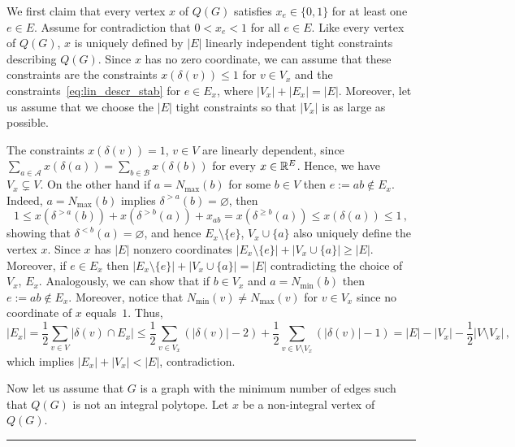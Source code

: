 \documentclass[3p,times]{elsarticle}
\newenvironment{proof}{{\bf Proof:  }}{\hfill\rule{2mm}{2mm}}
\begin{document}
\begin{proof}
  We first claim that every vertex $x$ of $Q(G)$ satisfies $x_e
  \in \{0,1\}$ for at least one $e \in E$. Assume for contradiction
  that $0 < x_e < 1$ for all $e \in E$. 
  Like every vertex of $Q(G)$, $x$ is uniquely defined by $|E|$ linearly independent tight constraints describing $Q(G)$. 
  Since $x$ has no zero coordinate, we can assume
  that these constraints are the constraints $x(\delta(v))\le 1$ for $v\in V_x$ 
  and the constraints~\eqref{eq:lin_descr_stab} for $e\in E_x$, where
  $|V_x|+|E_x|=|E|$. Moreover, let us assume that we choose the $|E|$
  tight constraints so that $|V_x|$ is as large as possible.

The constraints $x(\delta(v))=1$, $v\in V$ are linearly dependent, since $\sum_{a\in\mathcal{A}}x(\delta(a))=\sum_{b\in\mathcal{B}}x(\delta(b))$ for every $x \in \mathbb{R}^E$. Hence, we have $V_x\subsetneq V$. On the other hand if $a=N_{\max}(b)$ for some $b \in V$ then $e:=ab\not\in E_x$. Indeed, $a=N_{\max}(b)$ implies $\delta^{>a}(b)=\varnothing$, then
$$
	1\le x(\delta^{>a}(b))+ x(\delta^{>b}(a)) + x_{ab}=x(\delta^{\ge b}(a)) \le x(\delta(a)) \le 1\,,
$$
showing that $\delta^{< b}(a)=\varnothing$, and hence $E_x\setminus \{e\}$, $V_x\cup \{a\}$ also uniquely define the vertex $x$. Since $x$ has $|E|$ nonzero coordinates $|E_x \setminus \{e\}| + |V_x \cup \{a\}| \geq |E|$. Moreover, if $e \in E_x$ then $|E_x \setminus \{e\}| + |V_x \cup \{a\}| = |E|$ contradicting the choice of $V_x$, $E_x$. Analogously, we can show that if $b\in V_x$  and $a=N_{\min}(b)$ then $e:=ab\not\in E_x$. Moreover, notice that $N_{\min}(v)\neq N_{\max}(v)$ for $v\in V_x$ since no coordinate of $x$ equals~$1$. Thus, 
\[
	|E_x|=\frac{1}{2}\sum_{v\in V} |\delta(v)\cap E_x|\le \frac{1}{2}\sum_{v\in V_x} (|\delta(v)|-2)+\frac{1}{2}\sum_{v\in V\setminus V_x} (|\delta(v)|-1)= |E|-|V_x|-\frac{1}{2}|V\setminus V_x|\,,
\]
which implies $|E_x|+|V_x|< |E|$, contradiction.

\bigskip

Now let us assume that $G$ is a graph with the minimum number of edges such that $Q(G)$ is not an integral polytope. Let $x$ be a non-integral vertex of $Q(G)$.


\end{proof}
\end{document}
